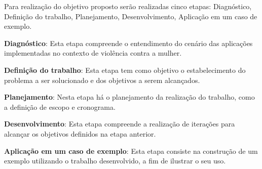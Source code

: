 Para realização do objetivo proposto serão realizadas cinco etapas: 
Diagnóstico, Definição do trabalho, Planejamento, Desenvolvimento, Aplicação em um caso de exemplo.

\noindent \textbf{Diagnóstico}: Esta etapa compreende o entendimento do cenário das aplicações implementadas no contexto de violência contra a mulher.

\noindent \textbf{Definição do trabalho}: Esta etapa tem como objetivo o estabelecimento do problema a ser solucionado e dos objetivos a serem alcançados.

\noindent \textbf{Planejamento}: Nesta etapa há o planejamento da realização do trabalho, como a definição de escopo e cronograma.

\noindent \textbf{Desenvolvimento}: Esta etapa compreende a realização de iterações para 
alcançar os objetivos definidos na etapa anterior.

\noindent \textbf{Aplicação em um caso de exemplo}: Esta etapa consiste na construção de um exemplo utilizando o
trabalho desenvolvido, a fim de ilustrar o seu uso.







